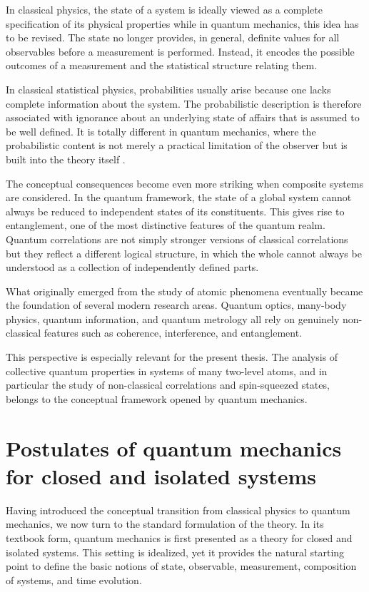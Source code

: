 In classical physics, the state of a system is ideally viewed as a complete specification of its physical properties while in quantum mechanics, this idea has to be revised.
The state no longer provides, in general, definite values for all observables before a measurement is performed.
Instead, it encodes the possible outcomes of a measurement and the statistical structure relating them.

In classical statistical physics, probabilities usually arise because one lacks complete information about the system.
The probabilistic description is therefore associated with ignorance about an underlying state of affairs that is assumed to be well defined.
It is totally different in quantum mechanics, where the probabilistic content is not merely a practical limitation of the observer but is built into the theory itself \cite{Born26}.

The conceptual consequences become even more striking when composite systems are considered.
In the quantum framework, the state of a global system cannot always be reduced to independent states of its constituents.
This gives rise to entanglement, one of the most distinctive features of the quantum realm.
Quantum correlations are not simply stronger versions of classical correlations but they reflect a different logical structure, in which the whole cannot always be understood as a collection of independently defined parts.

What originally emerged from the study of atomic phenomena eventually became the foundation of several modern research areas.
Quantum optics, many-body physics, quantum information, and quantum metrology all rely on genuinely non-classical features such as coherence, interference, and entanglement.

This perspective is especially relevant for the present thesis.
The analysis of collective quantum properties in systems of many two-level atoms, and in particular the study of non-classical correlations and spin-squeezed states, belongs to the conceptual framework opened by quantum mechanics.

\section{Postulates of quantum mechanics for closed and isolated systems}
\label{sec:postulates_of_quantum_mechanics_closed_and_isolated_systems}

Having introduced the conceptual transition from classical physics to quantum mechanics, we now turn to the standard formulation of the theory\cite{vonNeumann55,Dirac30}. In its textbook form, quantum mechanics is first presented as a theory for closed and isolated systems. This setting is idealized, yet it provides the natural starting point to define the basic notions of state, observable, measurement, composition of systems, and time evolution.


